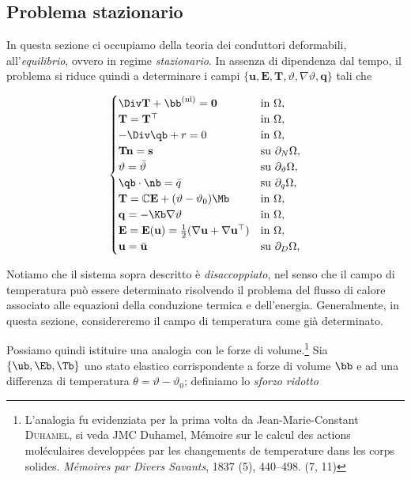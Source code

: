 \subsection{Problema stazionario}
In questa sezione ci occupiamo della teoria dei conduttori deformabili, all'\textit{equilibrio}, ovvero in regime \textit{stazionario}. In assenza di dipendenza dal tempo, il problema si riduce quindi a determinare i campi \( \{ \mathbf{u}, \mathbf{E}, \mathbf{T}, \vartheta, \nabla\vartheta, \mathbf{q} \}\) tali che 
\begin{definition}
	\begin{equation}
		\begin{cases}
			\Div\mathbf{T}+\bb^{({\rm ni})}=\mathbf{0}&\mathrm{in~}\Omega,\\
			\mathbf{T}=\mathbf{T}^\top&\mathrm{in~}\Omega,\\
			-\Div \qb +r=0 &\mathrm{in~}\Omega,\\
			\mathbf{T}\mathbf{n}=\mathbf{s}&\mathrm{su~}\partial_{N}\Omega,\\
			\vartheta=\bar{\vartheta}&\mathrm{su~}\partial_{\vartheta}\Omega,\\
			\qb\cdot \nb=\bar{q} &\mathrm{su~}\partial_{q}\Omega,\\
			\mathbf{T}=\mathbb{C}\mathbf{E}+(\vartheta-\vartheta_0)\Mb&\mathrm{in~}\Omega,\\
			\mathbf{q}=-\Kb \nabla\vartheta&\mathrm{in~}\Omega,\\
			\mathbf{E}=\mathbf{E}(\mathbf{u})=\frac{1}{2}(\nabla\mathbf{u}+\nabla\mathbf{u}^\top)&\mathrm{in~}\Omega,\\
			\mathbf{u}=\bar{\mathbf{u}}&\mathrm{su~}\partial_{D}\Omega,\\
				\end{cases}
	\end{equation}
\end{definition}
Notiamo che il sistema sopra descritto è \textit{disaccoppiato}, nel senso che il campo di temperatura può essere determinato risolvendo il problema 
del flusso di calore associato alle equazioni della conduzione termica e dell'energia. 
Generalmente, in questa sezione, considereremo il campo di temperatura come già determinato.

Possiamo quindi istituire una analogia con le forze di volume.\footnote{L'analogia fu evidenziata per la prima volta da  Jean-Marie-Constant \textsc{Duhamel}, si veda JMC Duhamel, Mémoire sur le calcul des actions moléculaires developpées par les changements de temperature dans les corps solides. \textit{Mémoires par Divers Savants}, 1837 (5), 440--498.
	(7, 11)} Sia $\{\ub, \Eb, \Tb\}$ uno stato elastico corrispondente a forze di volume $\bb$ e ad una differenza di temperatura $\theta=\vartheta-\vartheta_0$; definiamo lo \textit{sforzo ridotto}

